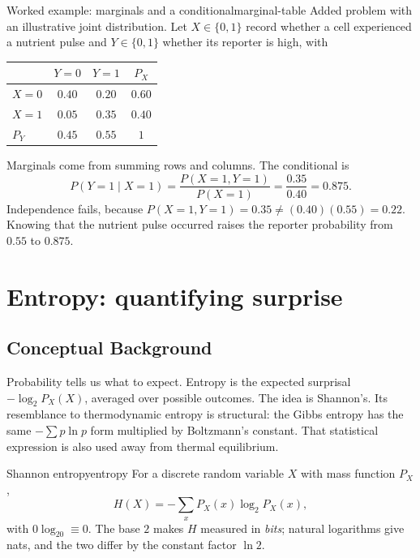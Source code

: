 \begin{example}[unbreakable,fontupper=\small]{Worked example: marginals and a conditional}{marginal-table}
Added problem with an illustrative joint distribution. Let $X\in\{0,1\}$ record whether a cell experienced a nutrient pulse and $Y\in\{0,1\}$ whether its reporter is high, with
\begin{center}\small
\begin{tabular}{@{}lccc@{}}
\toprule
 & $Y=0$ & $Y=1$ & $P_X$\\
\midrule
$X=0$ & $0.40$ & $0.20$ & $0.60$\\
$X=1$ & $0.05$ & $0.35$ & $0.40$\\
$P_Y$ & $0.45$ & $0.55$ & $1$\\
\bottomrule
\end{tabular}
\end{center}
Marginals come from summing rows and columns. The conditional is
\begin{equation}\label{eq:lec02:table-conditional}
P(Y=1\mid X=1)=\frac{P(X=1,Y=1)}{P(X=1)}=\frac{0.35}{0.40}=0.875.
\end{equation}
Independence fails, because $P(X=1,Y=1)=0.35\neq(0.40)(0.55)=0.22$. Knowing that the nutrient pulse occurred raises the reporter probability from $0.55$ to $0.875$.
\end{example}

\section{Entropy: quantifying surprise}\label{sec:lec02:entropy}

\subsection*{Conceptual Background}
Probability tells us what to expect. Entropy is the expected surprisal $-\log_2 P_X(X)$, averaged over possible outcomes. The idea is Shannon's. Its resemblance to thermodynamic entropy is structural: the Gibbs entropy has the same $-\sum p\ln p$ form multiplied by Boltzmann's constant. That statistical expression is also used away from thermal equilibrium.

\begin{definition}{Shannon entropy}{entropy}
For a discrete random variable $X$ with mass function $P_X$,
\begin{equation}\label{eq:lec02:entropy}
H(X)=-\sum_xP_X(x)\log_2P_X(x),
\end{equation}
with $0\log_20\equiv0$. The base $2$ makes $H$ measured in \emph{bits}; natural logarithms give nats, and the two differ by the constant factor $\ln2$.
\end{definition}

